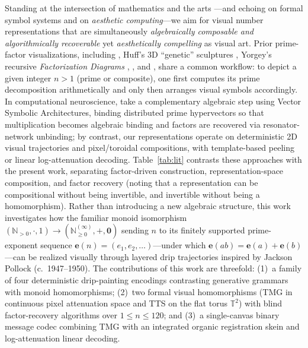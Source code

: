 \documentclass[]{interact}
\theoremstyle{plain}
\theoremstyle{definition}
\theoremstyle{remark}
\begin{document}
Standing at the intersection of mathematics and the arts \citep{emmer1993visual,bill1993mathematical}—and echoing \citet{goodman1968languages} on formal symbol systems and \citet{fishwick2006aesthetic} on \emph{aesthetic computing}—we aim for visual number representations that are simultaneously \emph{algebraically composable and algorithmically recoverable} yet \emph{aesthetically compelling} as visual art. Prior prime-factor visualizations, including \citet{ashwell2020prime}, Huff's 3D ``genetic'' sculptures \citep{huff2006visually}, Yorgey's recursive \emph{Factorization Diagrams} \citep{yorgey2012factorization}, \citet{reimann2024visual}, and \citet{basegmez2026symmetries}, share a common workflow: to depict a given integer $n > 1$ (prime or composite), one first computes its prime decomposition arithmetically and only then arranges visual symbols accordingly. In computational neuroscience, \citet{kleyko2022integer} take a complementary algebraic step using Vector Symbolic Architectures, binding distributed prime hypervectors so that multiplication becomes algebraic binding and factors are recovered via resonator-network unbinding; by contrast, our representations operate on deterministic 2D visual trajectories and pixel/toroidal compositions, with template-based peeling or linear log-attenuation decoding. Table~\ref{tab:lit} contrasts these approaches with the present work, separating factor-driven construction, representation-space composition, and factor recovery (noting that a representation can be compositional without being invertible, and invertible without being a homomorphism). Rather than introducing a new algebraic structure, this work investigates how the familiar monoid isomorphism $(\mathbb{N}_{>0}, \cdot, 1) \to (\mathbb{N}_{\ge 0}^{(\infty)}, +, \mathbf{0})$ sending $n$ to its finitely supported prime-exponent sequence $\mathbf{e}(n) = (e_1, e_2, \dots)$—under which $\mathbf{e}(ab) = \mathbf{e}(a) + \mathbf{e}(b)$—can be realized visually through layered drip trajectories inspired by Jackson Pollock (c.\ 1947--1950). The contributions of this work are threefold: (1)~a family of four deterministic drip-painting encodings contrasting generative grammars with monoid homomorphisms; (2)~two formal visual homomorphisms (TMG in continuous pixel attenuation space and TTS on the flat torus $\mathbb{T}^2$) with blind factor-recovery algorithms over $1 \le n \le 120$; and (3)~a single-canvas binary message codec combining TMG with an integrated organic registration skein and log-attenuation linear decoding.
\end{document}
